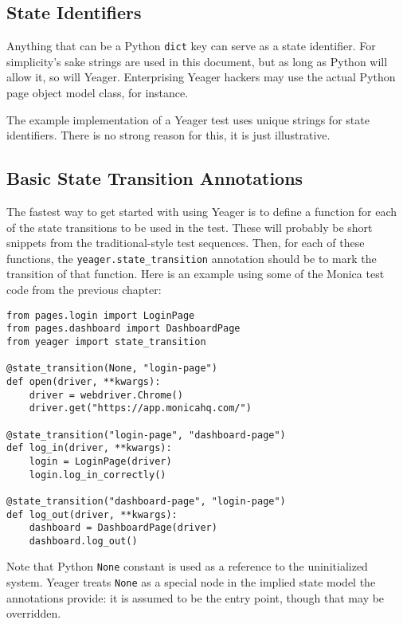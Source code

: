 \subsection{State Identifiers}
Anything that can be a Python \texttt{dict} key can serve as a state identifier. For simplicity's sake strings are used in this document, but as long as Python will allow it, so will Yeager. Enterprising Yeager hackers may use the actual Python page object model class, for instance.

The example implementation of a Yeager test uses unique strings for state identifiers. There is no strong reason for this, it is just illustrative.

\subsection{Basic State Transition Annotations}
The fastest way to get started with using Yeager is to define a function for each of the state transitions to be used in the test. These will probably be short snippets from the traditional-style test sequences. Then, for each of these functions, the \texttt{yeager.state\_transition} annotation should be to mark the transition of that function. Here is an example using some of the Monica test code from the previous chapter:

\begin{Verbatim}[fontsize=\small, baselinestretch=0.75]
from pages.login import LoginPage
from pages.dashboard import DashboardPage
from yeager import state_transition

@state_transition(None, "login-page")
def open(driver, **kwargs):
    driver = webdriver.Chrome()
    driver.get("https://app.monicahq.com/")

@state_transition("login-page", "dashboard-page")
def log_in(driver, **kwargs):
    login = LoginPage(driver)
    login.log_in_correctly()

@state_transition("dashboard-page", "login-page")
def log_out(driver, **kwargs):
    dashboard = DashboardPage(driver)
    dashboard.log_out()
\end{Verbatim}

Note that Python \texttt{None} constant is used as a reference to the uninitialized system. Yeager treats \texttt{None} as a special node in the implied state model the annotations provide: it is assumed to be the entry point, though that may be overridden.

